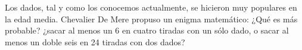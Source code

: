 \item Los dados, tal y como los conocemos actualmente, se hicieron muy populares en la edad media. Chevalier De Mere propuso un enigma matemático: ¿Qué es más probable? ¿sacar al menos un 6 en cuatro tiradas con un sólo dado, o sacar al menos un doble seis en 24 tiradas con dos dados?